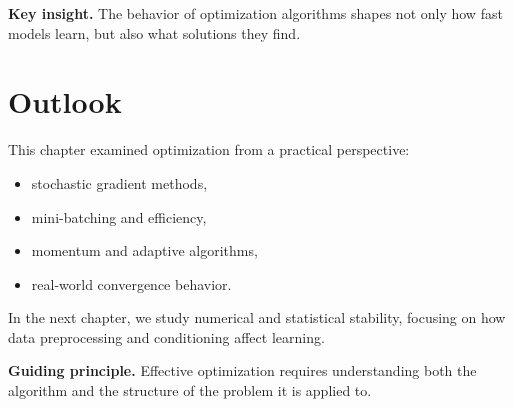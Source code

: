 \medskip

\noindent
\textbf{Key insight.}  
The behavior of optimization algorithms shapes not only how fast models learn, but also what solutions they find.

\section{Outlook}

This chapter examined optimization from a practical perspective:
\begin{itemize}
    \item stochastic gradient methods,
    \item mini-batching and efficiency,
    \item momentum and adaptive algorithms,
    \item real-world convergence behavior.
\end{itemize}

\medskip

In the next chapter, we study numerical and statistical stability, focusing on how data preprocessing and conditioning affect learning.

\medskip

\noindent
\textbf{Guiding principle.}  
Effective optimization requires understanding both the algorithm and the structure of the problem it is applied to.